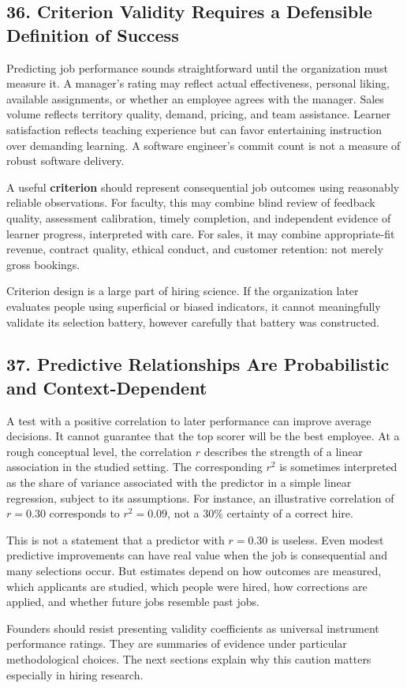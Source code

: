 \subsection*{36. Criterion Validity Requires a Defensible Definition of Success}

Predicting job performance sounds straightforward until the organization must measure it. A manager's rating may reflect actual effectiveness, personal liking, available assignments, or whether an employee agrees with the manager. Sales volume reflects territory quality, demand, pricing, and team assistance. Learner satisfaction reflects teaching experience but can favor entertaining instruction over demanding learning. A software engineer's commit count is not a measure of robust software delivery.

A useful \textbf{criterion} should represent consequential job outcomes using reasonably reliable observations. For faculty, this may combine blind review of feedback quality, assessment calibration, timely completion, and independent evidence of learner progress, interpreted with care. For sales, it may combine appropriate-fit revenue, contract quality, ethical conduct, and customer retention: not merely gross bookings.

Criterion design is a large part of hiring science. If the organization later evaluates people using superficial or biased indicators, it cannot meaningfully validate its selection battery, however carefully that battery was constructed.

\subsection*{37. Predictive Relationships Are Probabilistic and Context-Dependent}

A test with a positive correlation to later performance can improve average decisions. It cannot guarantee that the top scorer will be the best employee. At a rough conceptual level, the correlation $r$ describes the strength of a linear association in the studied setting. The corresponding $r^{2}$ is sometimes interpreted as the share of variance associated with the predictor in a simple linear regression, subject to its assumptions. For instance, an illustrative correlation of $r = 0.30$ corresponds to $r^{2} = 0.09$, not a 30\% certainty of a correct hire.

This is not a statement that a predictor with $r = 0.30$ is useless. Even modest predictive improvements can have real value when the job is consequential and many selections occur. But estimates depend on how outcomes are measured, which applicants are studied, which people were hired, how corrections are applied, and whether future jobs resemble past jobs.

Founders should resist presenting validity coefficients as universal instrument performance ratings. They are summaries of evidence under particular methodological choices. The next sections explain why this caution matters especially in hiring research.
